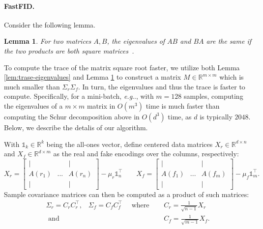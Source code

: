 \documentclass[11pt,a4paper,twoside,openright,final]{memoir}
\makeatletter
\newtheorem{lemma}{Lemma}
\DeclareRobustCommand\onedot{\futurelet\@let@token\@onedot}
\def\@onedot{\ifx\@let@token.\else.\null\fi\xspace}
\def\eg{\emph{e.g}\onedot} \def\Eg{\emph{E.g}\onedot}
\makeatother
\begin{document}
\paragraph{FastFID.}
Consider the following lemma.
\begin{lemma}\label{lem:product-eig}
    For two matrices $A, B$, the eigenvalues of $AB$ and $BA$ are the same if the two products are both square matrices~\cite{low-rank-eigenvalue-problem}.
\end{lemma}
To compute the trace of the matrix square root faster, we utilize both Lemma \ref{lem:trase-eigenvalues} and Lemma \ref{lem:product-eig} to construct a matrix $M\in \mathbb{R}^{m\times m}$ which is much smaller than $\Sigma_r\Sigma_f$. 
In turn, the eigenvalues and thus the trace is faster to compute.
Specifically, for a mini-batch, \eg, with $m=128$ samples, computing the eigenvalues of a $m\times m$ matrix in $O(m^3)$ time is much faster than computing the Schur decomposition above in $O(d^3)$ time, as $d$ is typically $2048$.
Below, we describe the detalis of our algorithm. 

With $\mathbb{1}_k \in \mathbb{R}^k$ being the all-ones vector, define centered data matrices $X_r\in\mathbb{R}^{d\times n}$ and $X_f\in \mathbb{R}^{d\times m}$ as the real and fake encodings over the columns, respectively:
\begin{equation}
    X_r = \left[
        \begin{matrix}
            | & & |\\
            A(r_1) & ... & A(r_n)\\
            | & & |
        \end{matrix}
    \right] - \mu_r\mathbb{1}_n^\intercal \qquad
    X_f = \left[
        \begin{matrix}
            | & & |\\
            A(f_1) & ... & A(f_m)\\
            | & & |
        \end{matrix} 
    \right] - \mu_f\mathbb{1}_m^\intercal.
\end{equation} 
Sample covariance matrices can then be computed as a product of such matrices:
\begin{align}
    \Sigma_r = C_rC_r^\intercal\text{,}\quad \Sigma_f=C_fC_f^\intercal\quad\text{ where }\quad & C_r = \frac{1}{\sqrt{n-1}}X_r\\
    \text{ and }\quad & C_f = \frac{1}{\sqrt{m-1}}X_f.
\end{align}
\end{document}
